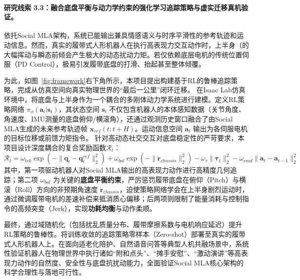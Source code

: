 \paragraph{\textbf{研究线索 3.3：融合底盘平衡与动力学约束的强化学习追踪策略与虚实迁移真机验证。}}

依托Social MLA架构，系统已能输出兼具情感语义与时序平滑性的参考轨迹和运动信息。然而，真实的履带式人形机器人在执行高表现力交互动作时，上半身（的大幅挥动与瞬态前倾会产生极大的动态扰动力矩。若仅依赖底层电机的传统位置伺服（PD Control），极易引发履带底盘的打滑、抬起甚至整体倾覆。

为此，如图~\ref{fig:framework}右下角所示，本项目提出构建基于RL的鲁棒追踪策略，完成从仿真空间向真实物理世界的“最后一公里”闭环迁移。
在Isaac Lab仿真环境中，将底盘与上半身作为一个耦合的多刚体动力学系统进行建模。定义RL策略网络 $\pi_\phi(\mathbf{a}_t | \mathbf{s}_t)$，其状态空间 $\mathbf{s}_t$ 不仅包含机器人的本体感知数据（关节角度、角速度、IMU测量的底盘俯仰/横滚角），还通过观测历史窗口融合了由Social MLA生成的未来参考轨迹帧 $\mathbf{x}_{ref}(t:t+H)$。运动信息空间 $\mathbf{a}_t$ 输出为各伺服电机的目标位移或前馈力矩指令。
针对高动态社交交互对底盘稳定性的严苛要求，本项目设计深度耦合的复合奖励函数$\mathcal{R}_t$：
\begin{equation}
\mathcal{R}_t = \omega_{trk} \exp(-\|\mathbf{q}_t - \mathbf{q}^{ref}_t\|^2_2) + \omega_{bal} \exp(-\| \dot{\mathbf{r}}_{chassis} \|^2_2) - \omega_{\tau} \|\mathbf{\tau}_t\|_2^2 - \omega_{cmd} \|\mathbf{a}_t - \mathbf{a}_{t-1}\|_2^2
\end{equation}
其中，第一项驱动机器人对Social MLA输出的高表现力动作进行高精度几何追踪；第二项 $\omega_{bal}$ 为关键的\textbf{底盘平衡约束}，严厉惩罚履带底盘在俯仰（Pitch）与横滚（Roll）方向的非预期角速度 $\dot{\mathbf{r}}_{chassis}$，迫使策略网络学会在上半身剧烈运动时，通过微调履带电机的差速补偿来抵消质心偏移；后两项则限制了能量消耗与控制指令的高频突变（Jerk），实现\textbf{功耗均衡}与动作柔顺。

最终，通过域随机化（包括扰乱质量分布、履带摩擦系数与电机响应延迟）提升RL策略的鲁棒性。将训练收敛的追踪策略零样本（Zero-shot）部署至真实的履带式人形机器人上。在面向适老化陪护、自然语音问答等典型人机共融场景中，系统性验证机器人在物理世界中执行诸如“附和点头”、“摊手安慰”、“激动演讲”等高表现力动作的自然度、安全性与底盘抗扰动能力，全面验证Social MLA核心架构的科学合理性与落地可行性。

